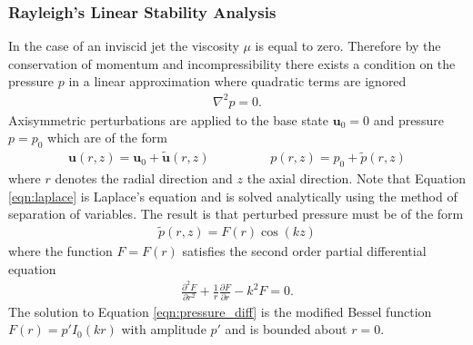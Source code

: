 \documentclass[11pt]{article}
\newcommand{\pd}[2]{\frac{\partial #1}{\partial #2}}
\newcommand{\pdtwo}[2]{\frac{\partial ^2 #1}{\partial #2 ^2}}
\begin{document}
\subsubsection{Rayleigh's Linear Stability Analysis}
In the case of an inviscid jet the viscosity $\mu$ is equal to zero. Therefore by the conservation of momentum and incompressibility there exists a condition on the pressure $p$  in a linear approximation where quadratic terms are ignored
\begin{align}
\nabla^2p = 0.
\label{eqn:laplace}
\end{align}
Axisymmetric perturbations are applied to the base state $\mathbf{u}_0 = 0$ and pressure $p = p_0$ which are of the form
\begin{align}
\mathbf{u}(r,z) = \mathbf{u}_0 + \tilde{\mathbf{u}}(r,z) \hspace{2cm} p(r,z) = p_0 + \tilde{p}(r,z)
\end{align}
where $r$ denotes the radial direction and $z$ the axial direction. Note that Equation \ref{eqn:laplace} is Laplace's equation and is solved analytically using the method of separation of variables. The result is that perturbed pressure must be of the form
\begin{align}
\tilde{p}(r,z) = F(r) \cos(kz)
\label{eqn:pressure_perturb}
\end{align}
where the function $F = F(r)$ satisfies the second order partial differential equation
\begin{align}
\pdtwo{F}{r} + \frac{1}{r} \pd{F}{r} -k^2 F = 0.
\label{eqn:pressure_diff}
\end{align}
The solution to Equation \ref{eqn:pressure_diff} is the modified Bessel function $F(r)=p'I_0(kr)$ with amplitude $p'$ and is bounded about $r=0$.
\end{document}
